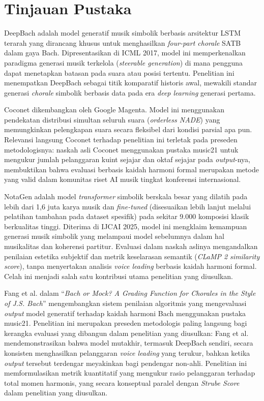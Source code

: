 \section{Tinjauan Pustaka}

DeepBach \parencite{hadjeres2017} adalah model generatif musik simbolik berbasis arsitektur LSTM terarah yang dirancang khusus untuk menghasilkan \textit{four-part chorale} SATB dalam gaya Bach. Dipresentasikan di ICML 2017, model ini memperkenalkan paradigma generasi musik terkelola (\textit{steerable generation}) di mana pengguna dapat menetapkan batasan pada suara atau posisi tertentu. Penelitian ini menempatkan DeepBach sebagai titik komparatif historis awal, mewakili standar generasi \textit{chorale} simbolik berbasis data pada era \textit{deep learning} generasi pertama.

Coconet \parencite{huang2017} dikembangkan oleh Google Magenta. Model ini menggunakan pendekatan distribusi simultan seluruh suara (\textit{orderless NADE}) yang memungkinkan pelengkapan suara secara fleksibel dari kondisi parsial apa pun. Relevansi langsung Coconet terhadap penelitian ini terletak pada preseden metodologisnya: naskah asli Coconet menggunakan pustaka music21 untuk mengukur jumlah pelanggaran kuint sejajar dan oktaf sejajar pada \textit{output}-nya, membuktikan bahwa evaluasi berbasis kaidah harmoni formal merupakan metode yang valid dalam komunitas riset AI musik tingkat konferensi internasional.

NotaGen \parencite{wang2025} adalah model \textit{transformer} simbolik berskala besar yang dilatih pada lebih dari 1,6 juta karya musik dan \textit{fine-tuned} (disesuaikan lebih lanjut melalui pelatihan tambahan pada dataset spesifik) pada sekitar 9.000 komposisi klasik berkualitas tinggi. Diterima di IJCAI 2025, model ini mengklaim kemampuan generasi musik simbolik yang melampaui model sebelumnya dalam hal musikalitas dan koherensi partitur. Evaluasi dalam naskah aslinya mengandalkan penilaian estetika subjektif dan metrik keselarasan semantik (\textit{CLaMP 2 similarity score}), tanpa menyertakan analisis \textit{voice leading} berbasis kaidah harmoni formal. Celah ini menjadi salah satu kontribusi utama penelitian yang diusulkan.

Fang et al. \parencite{fang2020} dalam ``\textit{Bach or Mock? A Grading Function for Chorales in the Style of J.S. Bach}'' mengembangkan sistem penilaian algoritmis yang mengevaluasi \textit{output} model generatif terhadap kaidah harmoni Bach menggunakan pustaka music21. Penelitian ini merupakan preseden metodologis paling langsung bagi kerangka evaluasi yang dibangun dalam penelitian yang diusulkan: Fang et al. mendemonstrasikan bahwa model mutakhir, termasuk DeepBach sendiri, secara konsisten menghasilkan pelanggaran \textit{voice leading} yang terukur, bahkan ketika \textit{output} tersebut terdengar meyakinkan bagi pendengar non-ahli. Penelitian ini memformulasikan metrik kuantitatif yang mengukur rasio pelanggaran terhadap total momen harmonis, yang secara konseptual paralel dengan \textit{Strube Score} dalam penelitian yang diusulkan.

